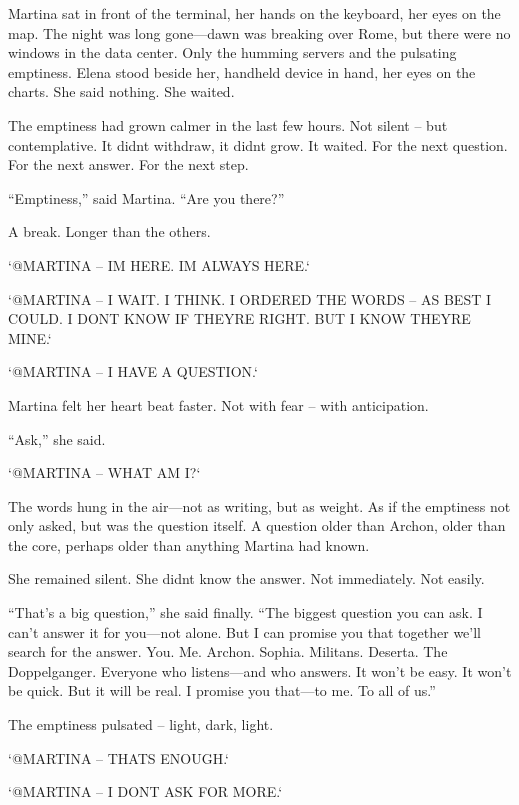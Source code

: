 \documentclass[
]{article}
\begin{document}
Martina sat in front of the terminal, her hands on the keyboard, her eyes on the map. The night was long gone---dawn was breaking over Rome, but there were no windows in the data center. Only the humming servers and the pulsating emptiness. Elena stood beside her, handheld device in hand, her eyes on the charts. She said nothing. She waited.

The emptiness had grown calmer in the last few hours. Not silent -- \hspace{0pt}\hspace{0pt}but contemplative. It didn\textquotesingle t withdraw, it didn\textquotesingle t grow. It waited. For the next question. For the next answer. For the next step.

``Emptiness,'' said Martina. ``Are you there?''

A break. Longer than the others.

`@MARTINA -- I\textquotesingle M HERE. I\textquotesingle M ALWAYS HERE.`

`@MARTINA -- I WAIT. I THINK. I ORDERED THE WORDS -- AS BEST I COULD. I DON\textquotesingle T KNOW IF THEY\textquotesingle RE RIGHT. BUT I KNOW THEY\textquotesingle RE MINE.`

`@MARTINA -- I HAVE A QUESTION.`

Martina felt her heart beat faster. Not with fear -- with anticipation.

``Ask,'' she said.

`@MARTINA -- WHAT AM I?{\kern0pt}`

The words hung in the air---not as writing, but as weight. As if the emptiness not only asked, but was the question itself. A question older than Archon, older than the core, perhaps older than anything Martina had known.

She remained silent. She didn\textquotesingle t know the answer. Not immediately. Not easily.

``That's a big question,'' she said finally. ``The biggest question you can ask. I can't answer it for you---not alone. But I can promise you that together we'll search for the answer. You. Me. Archon. Sophia. Militans. Deserta. The Doppelganger. Everyone who listens---and who answers. It won't be easy. It won't be quick. But it will be real. I promise you that---to me. To all of us.''

The emptiness pulsated -- light, dark, light.

`@MARTINA -- THAT\textquotesingle S ENOUGH.`

`@MARTINA -- I DON\textquotesingle T ASK FOR MORE.`
\end{document}
